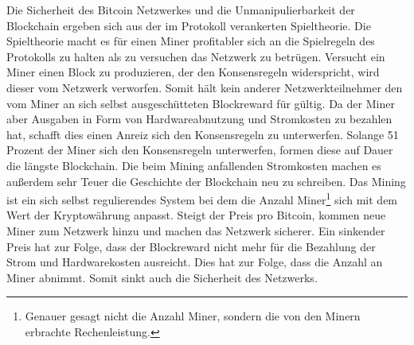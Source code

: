 Die Sicherheit des Bitcoin Netzwerkes und die Unmanipulierbarkeit der Blockchain ergeben sich aus der im Protokoll verankerten Spieltheorie. Die Spieltheorie macht es für einen Miner profitabler sich an die Spielregeln des Protokolls zu halten als zu versuchen das Netzwerk zu betrügen. Versucht ein Miner einen Block zu produzieren, der den Konsensregeln widerspricht, wird dieser vom Netzwerk verworfen. Somit hält kein anderer Netzwerkteilnehmer den vom Miner an sich selbst ausgeschütteten Blockreward für gültig. Da der Miner aber Ausgaben in Form von Hardwareabnutzung und Stromkosten zu bezahlen hat, schafft dies einen Anreiz sich den Konsensregeln zu unterwerfen. Solange 51 Prozent der Miner sich den Konsensregeln unterwerfen, formen diese auf Dauer die längste Blockchain. Die beim Mining anfallenden Stromkosten machen es außerdem sehr Teuer die Geschichte der Blockchain neu zu schreiben.
Das Mining ist ein sich selbst regulierendes System bei dem die Anzahl Miner\footnote{Genauer gesagt nicht die Anzahl Miner, sondern die von den Minern erbrachte Rechenleistung.} sich mit dem Wert der Kryptowährung anpasst. Steigt der Preis pro Bitcoin, kommen neue Miner zum Netzwerk hinzu und machen das Netzwerk sicherer. Ein sinkender Preis hat zur Folge, dass der Blockreward nicht mehr für die Bezahlung der Strom und Hardwarekosten ausreicht. Dies hat zur Folge, dass die Anzahl an Miner abnimmt. Somit sinkt auch die Sicherheit des Netzwerks.